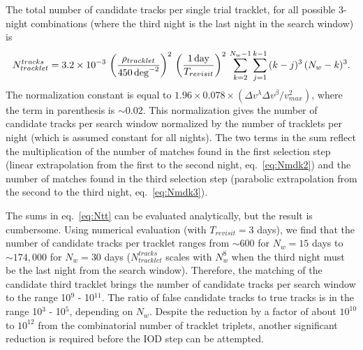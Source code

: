 The total number of candidate tracks per single trial tracklet, for all possible 3-night
combinations (where the third night is the last night in the search window) is 
\begin{equation}
\label{eq:Ntt}
   N_{tracklet}^{tracks} = 3.2\times10^{-3} \, \left( \rho_{tracklet}  \over 450 \, {\rm deg}^{-2} \right)^2 \, \left({1 \,{\rm day}\over T_{revisit}}\right)^2 \, \sum_{k=2}^{N_w-1} \sum_{j=1}^{k-1} \, (k-j)^3 \, (N_w-k)^3. 
\end{equation}
The normalization constant is equal to $1.96\times0.078\times(\Delta v^\lambda 
\Delta v^\beta/v_{max}^2)$, where the term in parenthesis is $\sim0.02$. This
normalization gives the number of candidate tracks per search window normalized
by the number of tracklets per night (which is assumed constant for all nights). 
The two terms in the sum reflect the multiplication of the number of matches found
in the first selection step (linear extrapolation from the first to the second night, 
eq.~\ref{eq:Nmdk2}) and the number of matches found in the third selection step
(parabolic extrapolation from the second to the third night, eq.~\ref{eq:Nmdk3}). 

The sums in eq.~\ref{eq:Ntt} can be evaluated analytically, but the result is cumbersome. 
Using numerical evaluation (with $T_{revisit}=3$ days), we find that the number of candidate 
tracks per tracklet ranges from $\sim600$ for $N_w=15$ days to $\sim174,000$ for 
$N_w=30$ days ($N_{tracklet}^{tracks}$ scales with $N_w^8$ when the third night must be 
the last night from the search window). 
Therefore, the matching of the candidate third tracklet brings the number of candidate 
tracks per search window to the range 10$^{9}$ - 10$^{11}$. The ratio of false candidate tracks
to true tracks is in the range 10$^{3}$ - 10$^{5}$, depending on $N_w$. Despite the reduction by 
a factor of  about $10^{10}$ to $10^{12}$ from the combinatorial number of tracklet triplets,  
another significant reduction is required before the IOD step can be attempted. 


